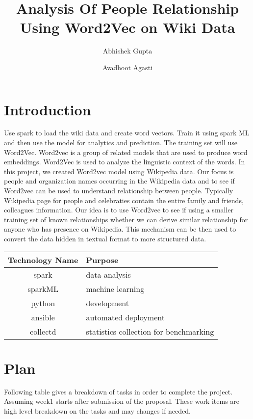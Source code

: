 \documentclass[9pt,twocolumn,twoside]{../../styles/osajnl}
\title{Analysis Of People Relationship Using Word2Vec on Wiki Data}
\author[1,*]{Abhishek Gupta}
\author[1, **]{Avadhoot Agasti}
\affil[1]{School of Informatics and Computing, Bloomington, IN 47408, U.S.A.}
\affil[*]{Corresponding authors: abhigupt@iu.edu}
\affil[**]{Corresponding authors: aagasti@iu.edu}
\begin{document}
\maketitle

\tableofcontents

\section{Introduction}

Use spark \cite{www-spark-python} to load the wiki data and create word vectors. Train it using spark ML  \cite{www-sparkml} and then use the model for analytics and prediction. The training set will use Word2Vec. Word2vec \cite{www-word2vec} is a group of related models that are used to produce word embeddings. Word2Vec is used to analyze the linguistic context of the words. In this project, we created Word2vec model using Wikipedia data. Our focus is people and organization names occurring in the Wikipedia data and to see if Word2vec can be used to understand relationship between people. Typically Wikipedia page for people and celebraties contain the entire family and friends, colleagues information. Our idea is to use Word2vec to see if using a smaller training set of known relationships whether we can derive similar relationship for anyone who has presence on Wikipedia. This mechanism can be then used to convert the data hidden in textual format to more structured data. 

\begin{center}
 \begin{tabular}{||c l||} 
 \hline
 Technology Name & Purpose  \\ [0.5ex] 
 \hline\hline
 spark \cite{www-spark-python} & data analysis  \\
 \hline
 sparkML \cite{www-sparkml} & machine learning  \\
 \hline
 python \cite{www-spark-python} & development \\
 \hline
 ansible \cite{www-ansible} & automated deployment \\
 \hline
 collectd \cite{www-collectd} & statistics collection for benchmarking \\
 \hline
\end{tabular}
\end{center}

\section{Plan}
Following table gives a breakdown of tasks in order to complete the project. Assuming week1 starts after submission of the proposal. These work items are high level breakdown on the tasks and may changes if needed.
\end{document}
